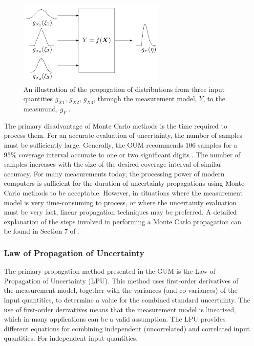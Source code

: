 \documentclass[../thesis/thesis.tex]{subfiles}
\begin{document}
\begin{figure}
	\centering
	\includegraphics[width=0.65\textwidth]{distributions}
	\caption[Propagation of probability distributions used in GUM Supplement 1.]{An illustration of the propagation of distributions from three input quantities $g_{X1}$, $g_{X2}$, $g_{X3}$, through the measurement model, $Y$, to the measurand, $g_{Y}$ \cite{GUM_S1}.}
	\label{ch3_fig_distributions}
\end{figure}

The primary disadvantage of Monte Carlo methods is the time required to process them. For an accurate evaluation of uncertainty, the number of samples must be sufficiently large. Generally, the GUM recommends 106 samples for a 95\% coverage interval accurate to one or two significant digits \cite[7.2.1]{GUM_S1}. The number of samples increases with the size of the desired coverage interval of similar accuracy. For many measurements today, the processing power of modern computers is sufficient for the duration of uncertainty propagations using Monte Carlo methods to be acceptable. However, in situations where the measurement model is very time-consuming to process, or where the uncertainty evaluation must be very fast, linear propagation techniques may be preferred. A detailed explanation of the steps involved in performing a Monte Carlo propagation can be found in Section 7 of \cite{GUM_S1}.

\subsubsection{Law of Propagation of Uncertainty}

The primary propagation method presented in the GUM is the Law of Propagation of Uncertainty (LPU). This method uses first-order derivatives of the measurement model, together with the variances (and co-variances) of the input quantities, to determine a value for the combined standard uncertainty. The use of first-order derivatives means that the measurement model is linearised, which in many applications can be a valid assumption. The LPU provides different equations for combining independent (uncorrelated) and correlated input quantities. For independent input quantities,
\end{document}
